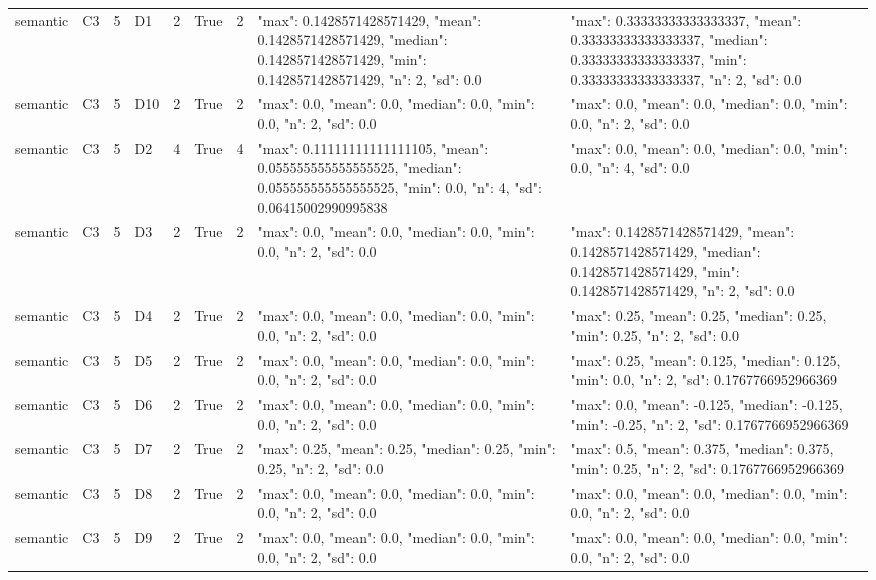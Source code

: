 \begin{tabular}{lllllllll}
semantic & C3 & 5 & D1 & 2 & True & 2 & {"max": 0.1428571428571429, "mean": 0.1428571428571429, "median": 0.1428571428571429, "min": 0.1428571428571429, "n": 2, "sd": 0.0} & {"max": 0.33333333333333337, "mean": 0.33333333333333337, "median": 0.33333333333333337, "min": 0.33333333333333337, "n": 2, "sd": 0.0} \\
semantic & C3 & 5 & D10 & 2 & True & 2 & {"max": 0.0, "mean": 0.0, "median": 0.0, "min": 0.0, "n": 2, "sd": 0.0} & {"max": 0.0, "mean": 0.0, "median": 0.0, "min": 0.0, "n": 2, "sd": 0.0} \\
semantic & C3 & 5 & D2 & 4 & True & 4 & {"max": 0.11111111111111105, "mean": 0.055555555555555525, "median": 0.055555555555555525, "min": 0.0, "n": 4, "sd": 0.06415002990995838} & {"max": 0.0, "mean": 0.0, "median": 0.0, "min": 0.0, "n": 4, "sd": 0.0} \\
semantic & C3 & 5 & D3 & 2 & True & 2 & {"max": 0.0, "mean": 0.0, "median": 0.0, "min": 0.0, "n": 2, "sd": 0.0} & {"max": 0.1428571428571429, "mean": 0.1428571428571429, "median": 0.1428571428571429, "min": 0.1428571428571429, "n": 2, "sd": 0.0} \\
semantic & C3 & 5 & D4 & 2 & True & 2 & {"max": 0.0, "mean": 0.0, "median": 0.0, "min": 0.0, "n": 2, "sd": 0.0} & {"max": 0.25, "mean": 0.25, "median": 0.25, "min": 0.25, "n": 2, "sd": 0.0} \\
semantic & C3 & 5 & D5 & 2 & True & 2 & {"max": 0.0, "mean": 0.0, "median": 0.0, "min": 0.0, "n": 2, "sd": 0.0} & {"max": 0.25, "mean": 0.125, "median": 0.125, "min": 0.0, "n": 2, "sd": 0.1767766952966369} \\
semantic & C3 & 5 & D6 & 2 & True & 2 & {"max": 0.0, "mean": 0.0, "median": 0.0, "min": 0.0, "n": 2, "sd": 0.0} & {"max": 0.0, "mean": -0.125, "median": -0.125, "min": -0.25, "n": 2, "sd": 0.1767766952966369} \\
semantic & C3 & 5 & D7 & 2 & True & 2 & {"max": 0.25, "mean": 0.25, "median": 0.25, "min": 0.25, "n": 2, "sd": 0.0} & {"max": 0.5, "mean": 0.375, "median": 0.375, "min": 0.25, "n": 2, "sd": 0.1767766952966369} \\
semantic & C3 & 5 & D8 & 2 & True & 2 & {"max": 0.0, "mean": 0.0, "median": 0.0, "min": 0.0, "n": 2, "sd": 0.0} & {"max": 0.0, "mean": 0.0, "median": 0.0, "min": 0.0, "n": 2, "sd": 0.0} \\
semantic & C3 & 5 & D9 & 2 & True & 2 & {"max": 0.0, "mean": 0.0, "median": 0.0, "min": 0.0, "n": 2, "sd": 0.0} & {"max": 0.0, "mean": 0.0, "median": 0.0, "min": 0.0, "n": 2, "sd": 0.0} \\
\end{tabular}